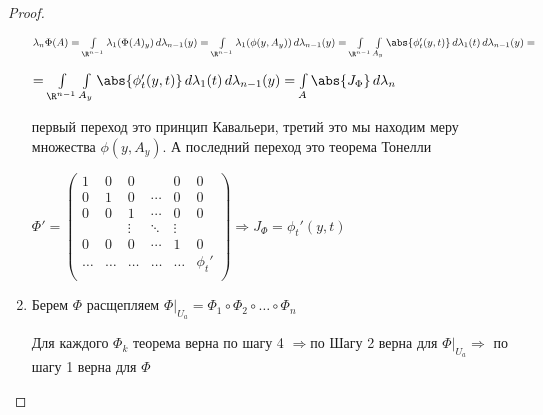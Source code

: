 \begin{proof}
\begin{enumerate}[Шаг 1.]
		$\lambda_n\Phi(A) = \int\limits_{\R^{n-1}} \lambda_1(\Phi(A)_y) \,d\lambda_{n-1}(y) = \int\limits_{\R^{n-1}}\lambda_1(\phi(y, A_y)) \,d\lambda_{n-1}(y) = \int\limits_{\R^{n-1}}\int\limits_{A_y} \abs{\phi_t'(y, t)} \,d\lambda_1(t)\,d\lambda_{n-1}(y) = $
		
		$= \int\limits_{\R^{n-1}}\int\limits_{A_y} \abs{\phi_t'(y, t)} \,d\lambda_1(t)\,d\lambda_{n-1}(y) = \int\limits_{A} \abs{J_\Phi}\,d\lambda_n$
		
		первый переход это принцип Кавальери, третий это мы находим меру множества $\phi(y, A_y)$. А последний переход это теорема Тонелли 
		
		$\Phi' = \begin{pmatrix}
		1 & 0 & 0 &   & 0 & 0 \\
		0 & 1 & 0 & \cdots & 0 & 0 \\
		0 & 0 & 1 & \cdots & 0 & 0 \\
		&  &\vdots & \ddots & \vdots & \\
		0 & 0 & 0 & \cdots & 1 & 0 \\
		\ldots& \ldots &\ldots &\ldots &\ldots & \phi_t' \\
		\end{pmatrix} \Rightarrow J_\Phi = \phi_t'(y, t)$
		
		
		\item Берем $\Phi$ расщепляем $\left. \Phi\right|_{U_a} = \Phi_1 \circ \Phi_2\circ \ldots \circ \Phi_n$ 
		
		Для каждого $\Phi_k$ теорема верна по шагу 4 $\Rightarrow $по Шагу 2 верна для $\left. \Phi\right|_{U_a} \Rightarrow$ по шагу 1 верна для $\Phi$
	\end{enumerate}
	
\end{proof}
